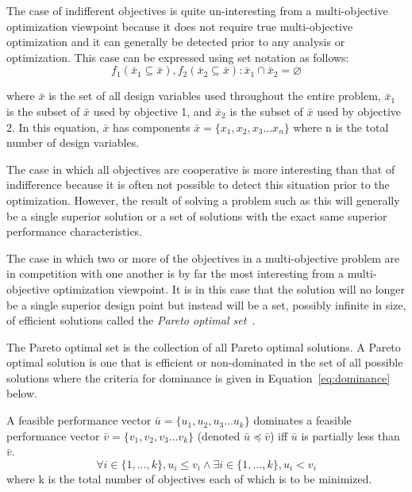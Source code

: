 The case of indifferent objectives is quite un-interesting from a
multi-objective optimization viewpoint because it does not require
true multi-objective optimization and it can generally be detected
prior to any analysis or optimization.  This case can be expressed
using set notation as follows:
\begin{equation}\label{eq:indifference}
    f_1(\bar{x}_1\subseteq{\bar{x}}),f_2(\bar{x}_2\subseteq{\bar{x}}):\bar{x}_1 \cap
    \bar{x}_2=\varnothing
\end{equation}

\noindent where $\bar{x}$ is the set of all design variables used
throughout the entire problem, $\bar{x}_1$ is the subset of
$\bar{x}$ used by objective 1, and $\bar{x}_2$ is the subset of
$\bar{x}$ used by objective 2. In this equation, $\bar{x}$ has
components $\bar{x}=\{x_1,x_2,x_3...x_n\}$ where n is the total
number of design variables.

The case in which all objectives are cooperative is more interesting
than that of indifference because it is often not possible to detect
this situation prior to the optimization.  However, the result of
solving a problem such as this will generally be a single superior
solution or a set of solutions with the exact same superior
performance characteristics.

The case in which two or more of the objectives in a multi-objective
problem are in competition with one another is by far the most
interesting from a multi-objective optimization viewpoint.  It is in
this case that the solution will no longer be a single superior
design point but instead will be a set, possibly infinite in size,
of efficient solutions called the \emph{Pareto optimal
set}~\cite{pareto:manuale:1906}.

The Pareto optimal set is the collection of all Pareto optimal
solutions. A Pareto optimal solution is one that is efficient or
non-dominated in the set of all possible solutions where the
criteria for dominance is given in Equation~\ref{eq:dominance}
below.

A feasible performance vector $\bar{u}=\{u_1,u_2,u_3...u_k\}$
dominates a feasible performance vector
$\bar{v}=\{v_1,v_2,v_3...v_k\}$ (denoted $\bar{u} \preceq \bar{v}$)
iff $\bar{u}$ is partially less than $\bar{v}$.
\begin{equation}\label{eq:dominance}
    \forall i \in
    \{1,...,k\},u_i \leq v_i\wedge \exists i \in \{1,...,k\},u_i < v_i
\end{equation}
\noindent where k is the total number of objectives each of which is
to be minimized.

